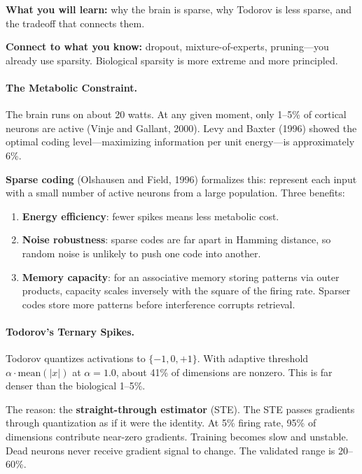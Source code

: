 \documentclass[11pt,a4paper]{article}
\begin{document}
\textbf{What you will learn:} why the brain is sparse, why Todorov is less sparse, and the tradeoff that connects them.

\textbf{Connect to what you know:} dropout, mixture-of-experts, pruning---you already use sparsity. Biological sparsity is more extreme and more principled.

\paragraph{The Metabolic Constraint.}

The brain runs on about 20 watts. At any given moment, only 1--5\% of cortical neurons are active (Vinje and Gallant, 2000). Levy and Baxter (1996) showed the optimal coding level---maximizing information per unit energy---is approximately 6\%.

\textbf{Sparse coding} (Olshausen and Field, 1996) formalizes this: represent each input with a small number of active neurons from a large population. Three benefits:
\begin{enumerate}
  \item \textbf{Energy efficiency}: fewer spikes means less metabolic cost.
  \item \textbf{Noise robustness}: sparse codes are far apart in Hamming distance, so random noise is unlikely to push one code into another.
  \item \textbf{Memory capacity}: for an associative memory storing patterns via outer products, capacity scales inversely with the square of the firing rate. Sparser codes store more patterns before interference corrupts retrieval.
\end{enumerate}

\paragraph{Todorov's Ternary Spikes.}

Todorov quantizes activations to $\{-1, 0, +1\}$. With adaptive threshold $\alpha \cdot \mathrm{mean}(|x|)$ at $\alpha = 1.0$, about 41\% of dimensions are nonzero. This is far denser than the biological 1--5\%.

The reason: the \textbf{straight-through estimator} (STE). The STE passes gradients through quantization as if it were the identity. At 5\% firing rate, 95\% of dimensions contribute near-zero gradients. Training becomes slow and unstable. Dead neurons never receive gradient signal to change. The validated range is 20--60\%.
\end{document}
